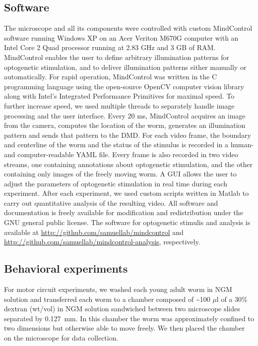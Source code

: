 \subsection{Software}
The microscope and all its components were controlled with custom MindControl software running Windows XP on an Acer Veriton M670G computer with an Intel Core 2 Quad processor running at 2.83 GHz and 3 GB of RAM. MindControl enables the user to define arbitrary illumination patterns for optogenetic stimulation, and to deliver illumination patterns either manually or automatically. For rapid operation, MindControl was written in the C programming language using the open-source OpenCV computer vision library along with Intel's Integrated Performance Primitives for maximal speed. To further increase speed, we used multiple threads to separately handle image processing and the user interface. Every 20 ms, MindControl acquires an image from the camera, computes the location of the worm, generates an illumination pattern and sends that pattern to the DMD. For each video frame, the boundary and centerline of the worm and the status of the stimulus is recorded in a human- and computer-readable YAML file. Every frame is also recorded in two video streams, one containing annotations about optogenetic stimulation, and the other containing only images of the freely moving worm. A GUI allows the user to adjust the parameters of optogenetic stimulation in real time during each experiment. After each experiment, we used custom scripts written in Matlab to carry out quantitative analysis of the resulting video. All software and documentation is freely available for modification and redistribution under the GNU general public license. The software for optogenetic stimulis and analysis is available at \url{http://github.com/samuellab/mindcontrol} and  \url{http://github.com/samuellab/mindcontrol-analysis}, respectively.


\subsection{Behavioral experiments}

For motor circuit experiments, we washed each young adult worm in NGM solution and transferred each worm to a chamber composed of \textasciitilde100 $\mu$l of a 30\% dextran (wt/vol) in NGM solution sandwiched between two microscope slides separated by 0.127~mm. In this chamber the worm was approximately confined to two dimensions but otherwise able to move freely. We then placed the chamber on the microscope for data collection.

